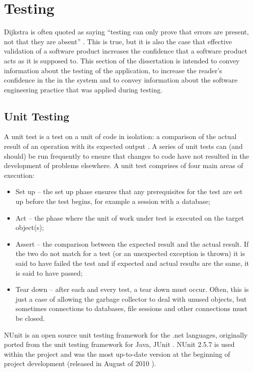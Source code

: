 \chapter{Testing}
\label{testing}
Dijkstra is often quoted as saying ``testing can only prove that errors are present, not that they are absent'' \cite{dijkstra}. This is true, but it is also the case that effective validation of a software product increases the confidence that a software product acts as it is supposed to.  This section of the dissertation is intended to convey information about the testing of the application, to increase the reader's confidence in the in the system and to convey information about the software engineering practice that was applied during testing.

\section{Unit Testing}
A unit test is a test on a unit of code in isolation: a comparison of the actual result of an operation with its expected output \cite{unitTesting}.  A series of unit tests can (and should) be run frequently to ensure that changes to code have not resulted in the development of problems elsewhere.  A unit test comprises of four main areas of execution:
\begin{itemize}
	\item Set up -- the set up phase ensures that any prerequisites for the test are set up before the test begins, for example a session with a database;
	\item Act -- the phase where the unit of work under test is executed on the target object(s);
	\item Assert -- the comparison between the expected result and the actual result.  If the two do not match for a test (or an unexpected exception is thrown) it is said to have failed the test and if expected and actual results are the same, it is said to have passed;
	\item Tear down -- after each and every test, a tear down must occur.  Often, this is just a case of allowing the garbage collector to deal with unused objects, but sometimes connections to databases, file sessions and other connections must be closed.
\end{itemize}

NUnit is an open source unit testing framework for the .\gls{net} languages, originally ported from the unit testing framework for Java, JUnit \cite{nUnitHome}.  NUnit 2.5.7 is used within the project and was the most up-to-date version at the beginning of project development (released in August of 2010 \cite{nUnitRelease}).  

